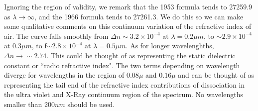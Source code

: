 \documentclass[12pt]{article}
\begin{document}
Ignoring the region of validity, we remark that the  1953 formula tends to 27259.9
 as $\lambda \rightarrow \infty$,  and the 1966 formula tends to 27261.3. We do this so we can make some qualitative comments on
this continuum variation of the refractive index of air. The
curve falls smoothly from $\Delta n \sim 3.2 \times 10^{-4}$
 at $\lambda=0.2 \mu m$, to $\sim 2.9 \times 10^{-4}$ at 0.3$\mu m$, to f$\sim 2.8 \times 10^{-4}$ at $\lambda=0.5 \mu m$. As for longer wavelenghths, $\Delta n \rightarrow \sim 2.74$. This could be thought of as representing the static dielectric constant or ``radio refractive index".
The two terms depending on wavelength diverge for wavelengths in the region of $0.08 \mu$ and $0.16 \mu$ and can be thought of as representing the tail end of the refractive index contributions of dissociation in the ultra violet and X-Ray continuum region of the spectrum. No wavelengths smaller than 200$nm$ should be used.





\newpage


\end{document}
